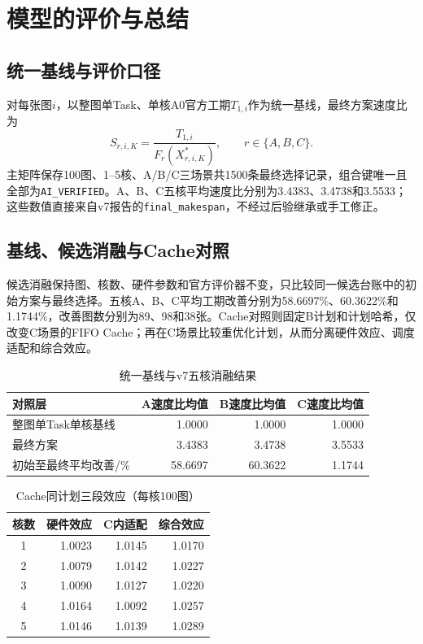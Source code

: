 \section{模型的评价与总结}
\label{sec:evaluation}

\subsection{统一基线与评价口径}
对每张图$i$，以整图单Task、单核A0官方工期$T_{1,i}$作为统一基线，最终方案速度比为
\begin{equation}
S_{r,i,K}=\frac{T_{1,i}}{F_r(X^*_{r,i,K})},\qquad r\in\{A,B,C\}.
\label{eq:eval-speedup}
\end{equation}
主矩阵保存100图、1--5核、A/B/C三场景共1500条最终选择记录，组合键唯一且全部为\texttt{AI\_VERIFIED}。A、B、C五核平均速度比分别为3.4383、3.4738和3.5533；这些数值直接来自v7报告的\texttt{final\_makespan}，不经过后验继承或手工修正。

\subsection{基线、候选消融与Cache对照}
候选消融保持图、核数、硬件参数和官方评价器不变，只比较同一候选台账中的初始方案与最终选择。五核A、B、C平均工期改善分别为58.6697\%、60.3622\%和1.1744\%，改善图数分别为89、98和38张。Cache对照则固定B计划和计划哈希，仅改变C场景的FIFO Cache；再在C场景比较重优化计划，从而分离硬件效应、调度适配和综合效应。
\begin{table}[H]\centering\small
\caption{统一基线与v7五核消融结果}\label{tab:baseline-ablation}
\begin{tabular}{lrrr}\toprule
对照层 & A速度比均值 & B速度比均值 & C速度比均值\\\midrule
整图单Task单核基线 & 1.0000 & 1.0000 & 1.0000\\
最终方案 & 3.4383 & 3.4738 & 3.5533\\
初始至最终平均改善/\% & 58.6697 & 60.3622 & 1.1744\\
\bottomrule
\end{tabular}
\end{table}


\begin{table}[H]\centering\small
\caption{Cache同计划三段效应（每核100图）}\label{tab:eval-cache-factors}
\begin{tabular}{crrr}\toprule
核数 & 硬件效应 & C内适配 & 综合效应\\\midrule
1 & 1.0023 & 1.0145 & 1.0170\\
2 & 1.0079 & 1.0142 & 1.0227\\
3 & 1.0090 & 1.0127 & 1.0220\\
4 & 1.0164 & 1.0092 & 1.0257\\
5 & 1.0146 & 1.0139 & 1.0289\\\bottomrule
\end{tabular}
\end{table}

